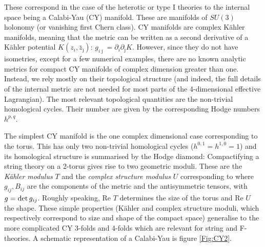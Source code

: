 These correspond in the case of the heterotic or type I theories to the internal space being a Calabi-Yau (CY) manifold. These are manifolds of $SU(3)$ holonomy (or vanishing first Chern class). CY manifolds are complex K\"ahler manifolds, meaning that the metric can be written as a second derivative of a K\"ahler potential $K(z_i, \bar z_{\bar\jmath})$: $g_{i\bar\jmath}=\partial_i\partial_{\bar\jmath} K$. 
However, since they do not have isometries, except for a few numerical examples, there are no known analytic metrics 
for compact CY manifolds of complex dimension greater than one.  Instead, we rely mostly on their topological structure 
(and indeed, the full details of the internal metric are not needed for most parts of the 4-dimensional effective Lagrangian). 
The most relevant topological quantities are the non-trivial homological cycles. 
Their number are given by the corresponding Hodge numbers $h^{p,q}$.  

The simplest CY manifold is the one complex dimensional case corresponding to the torus. This has only two non-trivial homological cycles ($h^{0,1}=h^{1,0}=1$) and its homological structure is summarised by the Hodge diamond:
\bea
\setlength\fboxsep{0.25cm}
\setlength\fboxrule{0.4pt}
\nonumber
\eea
Compactifying a string theory on a 2-torus gives rise to two geometric moduli. These are the \emph{K\"ahler modulus} $T$ and the \emph{complex structure modulus} $U$ corresponding to 
\be
\setlength\fboxsep{0.25cm}
\setlength\fboxrule{0.4pt}
\ee
where $g_{ij}, B_{ij}$ are the components of the metric and the antisymmetric tensors, with $g ={\rm det} \, g_{ij}$. Roughly speaking, Re $T$ determines the size of the torus and Re $U$ the shape. These simple properties (K\"ahler and complex structure moduli, which respectively correspond to size and shape of the compact space) generalise to the more complicated CY 3-folds and 4-folds which are relevant for string and F-theories. A schematic representation of a Calabi-Yau is figure \ref{Fig:CY2}.


